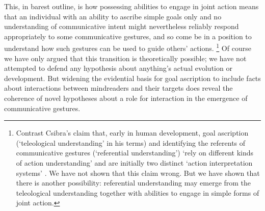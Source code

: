 \documentclass[12pt,\papersize]{extarticle}
\begin{document}
This, in barest outline, is 
how
possessing abilities to engage in joint action
means that 
an individual with an ability to ascribe simple goals only and no understanding of communicative intent
might 
nevertheless reliably respond appropriately to some communicative gestures,
and so come be in a position to understand how such gestures can be used to guide others' actions.%
\footnote{
Contrast Csibra's claim that,
early in human development,
goal ascription (`teleological understanding' in his terms)
and 
identifying the referents of communicative gestures (`referential understanding')
`rely on different kinds of action understanding' %
and
are initially two distinct `action interpretation systems'   \citep[p.\ 456]{Csibra:2003kp}.
We have not shown that this claim wrong.
But we have shown that there is another possibility:
 referential understanding may 
emerge from
the teleological understanding 
 together with abilities to engage in simple forms of joint action.
}
Of course we have only argued that this transition is theoretically possible;
we have not attempted to defend any hypothesis about 
anything's actual evolution or development.
But widening the evidential basis for goal ascription to include facts about interactions between mindreaders and their targets 
does reveal the coherence of  
novel hypotheses about a role for interaction in the emergence  of communicative gestures.

\end{document}
